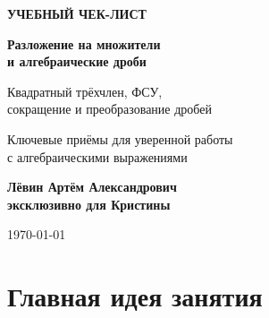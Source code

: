 \documentclass[a4paper,12pt]{article}
\begin{document}

\begin{titlepage}
\thispagestyle{empty}

\begin{center}

\vspace*{24mm}

{\small\color{accent}\bfseries УЧЕБНЫЙ ЧЕК-ЛИСТ}

\vspace{10mm}

{\Huge\bfseries\color{darkaccent}
Разложение на множители\\[2mm]
и алгебраические дроби
}

\vspace{8mm}

{\Large
Квадратный трёхчлен, ФСУ,\\
сокращение и преобразование дробей
}

\vspace{18mm}

{\large
Ключевые приёмы для уверенной работы\\
с алгебраическими выражениями
}

\vfill

{\large\bfseries
Лёвин Артём Александрович\\[2mm]
эксклюзивно для Кристины
}

\vspace{10mm}

{\large \today}

\end{center}


\end{titlepage}


\section{Главная идея занятия}
\end{document}
